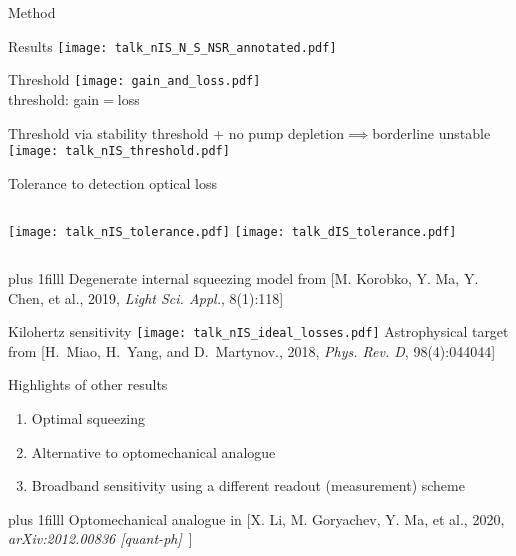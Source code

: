 \documentclass[12pt,xcolor=dvipsnames]{beamer}
\begin{document}
\begin{frame}{Method} 
\end{frame}

\begin{frame}{Results}
\centering
\texttt{[image: talk\_nIS\_N\_S\_NSR\_annotated.pdf]}
\end{frame}

\begin{frame}{Threshold}
\centering
\texttt{[image: gain\_and\_loss.pdf]}
\\\vspace*{1cm}
\large{threshold: gain$=$loss}
\end{frame}

\begin{frame}{Threshold via stability}
\centering
threshold + no pump depletion$\implies$borderline unstable
\pause
\texttt{[image: talk\_nIS\_threshold.pdf]}
\end{frame}

\begin{frame}{Tolerance to detection optical loss}
\begin{columns}
\centering
\texttt{[image: talk\_nIS\_tolerance.pdf]}
\centering
\hspace*{-.3cm}
\texttt{[image: talk\_dIS\_tolerance.pdf]} %
\end{columns}
\vskip0pt plus 1filll
\centering
{\tiny Degenerate internal squeezing model from [M. Korobko, Y. Ma, Y. Chen, et al., 2019, \emph{Light Sci. Appl.}, 8(1):118]}\\
\end{frame}

\begin{frame}{Kilohertz sensitivity}
\centering
\texttt{[image: talk\_nIS\_ideal\_losses.pdf]}
{\tiny\vspace{-0.2cm}Astrophysical target from [H.~Miao, H.~Yang, and D.~Martynov., 2018, \emph{Phys. Rev. D}, 98(4):044044]}
\end{frame}

\begin{frame}{Highlights of other results}
\vspace{2cm}
	\begin{enumerate}
	\item Optimal squeezing
	\item Alternative to optomechanical analogue
	\item Broadband sensitivity using a different readout (measurement) scheme 
	\end{enumerate}
\vskip0pt plus 1filll
\centering
{\tiny\vspace{-0.15cm}Optomechanical analogue in [X. Li, M. Goryachev, Y. Ma, et al., 2020, \emph{arXiv:2012.00836 [quant-ph]}\ ]}
\end{frame}
\end{document}
